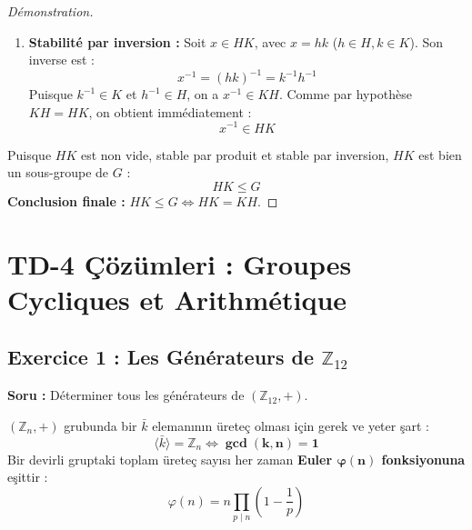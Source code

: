 \documentclass[12pt,a4paper]{report}
\begin{document}
\begin{proof}[Démonstration]
\begin{enumerate}
    \item \textbf{Stabilité par inversion :}  
    Soit $x \in HK$, avec $x = hk$ ($h \in H, k \in K$). Son inverse est :
    \[ x^{-1} = (hk)^{-1} = k^{-1} h^{-1} \]
    Puisque $k^{-1} \in K$ et $h^{-1} \in H$, on a $x^{-1} \in KH$.  
    Comme par hypothèse $KH = HK$, on obtient immédiatement :
    \[ x^{-1} \in HK \]
\end{enumerate}
Puisque $HK$ est non vide, stable par produit et stable par inversion, $HK$ est bien un sous-groupe de $G$ :
\[ HK \leq G \]
\textbf{Conclusion finale :} $HK \leq G \iff HK = KH$.
\end{proof}

\newpage
\section{TD-4 Çözümleri : Groupes Cycliques et Arithmétique}

\subsection*{Exercice 1 : Les Générateurs de $\mathbb{Z}_{12}$}
\textbf{Soru :} Déterminer tous les générateurs de $(\mathbb{Z}_{12}, +)$.

\begin{tcolorbox}[colback=blue!5!white,colframe=blue!75!black,title=Kural : $\mathbb{Z}_n$'nin Üreteçleri ve Euler $\varphi(n)$ Fonksiyonu]
$(\mathbb{Z}_n, +)$ grubunda bir $\bar{k}$ elemanının üreteç olması için gerek ve yeter şart :
\[ \langle \bar{k} \rangle = \mathbb{Z}_n \iff \mathbf{\gcd(k, n) = 1} \]
Bir devirli gruptaki toplam üreteç sayısı her zaman \textbf{Euler $\mathbf{\varphi(n)}$ fonksiyonuna} eşittir :
\[ \varphi(n) = n \prod_{p \mid n} \left(1 - \frac{1}{p}\right) \]
\end{tcolorbox}
\end{document}
